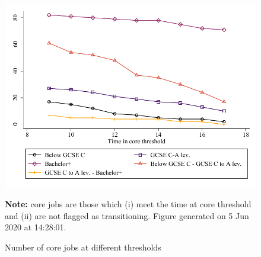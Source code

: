 \begin{figure}[!h]
\caption{Number of core jobs at different thresholds}
\includegraphics[width=\textwidth]{../output/core_jobs_relaxing}
\par \begin{minipage}[h]{\textwidth}{\scriptsize\textbf{Note:} core jobs are those which (i) meet the time at core threshold and (ii) are not flagged as transitioning. Figure generated on  5 Jun 2020 at 14:28:01.}\end{minipage}
\end{figure}

